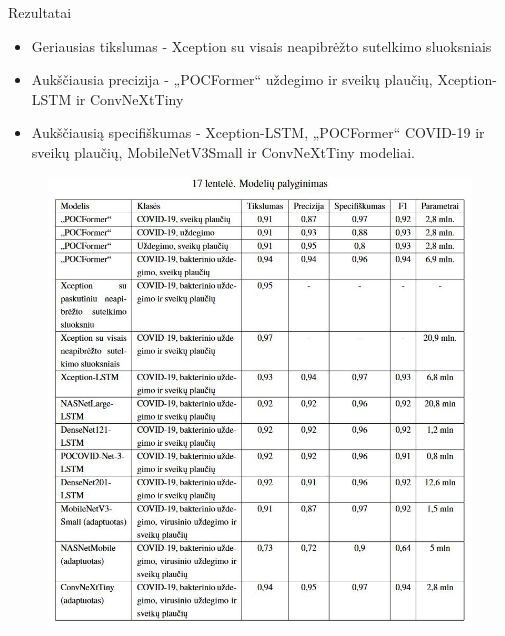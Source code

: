 \documentclass{VUMIFSlides}
\begin{document}
\begin{frame}[c]{Rezultatai}
    \begin{minipage}[c]{0.45\textwidth}
        \begin{itemize}
            \item Geriausias tikslumas - Xception su visais neapibrėžto sutelkimo sluoksniais
            \item Aukščiausia precizija - „POCFormer“ uždegimo ir sveikų plaučių, Xception-LSTM ir ConvNeXtTiny
            \item Aukščiausią specifiškumas - Xception-LSTM, „POCFormer“ COVID-19 ir sveikų plaučių, MobileNetV3Small ir ConvNeXtTiny modeliai.
        \end{itemize}
    \end{minipage}
    \hfill
    \begin{minipage}[c]{0.45\textwidth}
        \begin{figure}[H]
            \centering
            \includegraphics[scale=0.33]{img/Capture.JPG}
            \label{img:POCFormer}
        \end{figure}
    \end{minipage}
\end{frame}
\end{document}
